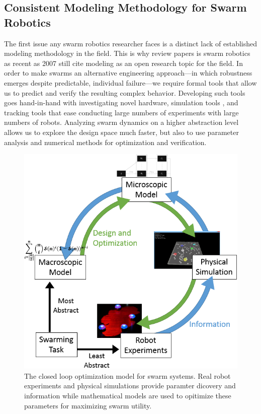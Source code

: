 \documentclass[11pt, onecolumn, compsoc, letterpaper]{article}
\begin{document}
\subsection{Consistent Modeling Methodology for Swarm Robotics}
The first issue any swarm robotics researcher faces is a distinct lack of established modeling methodology in the field.  This is why review papers is swarm robotics as recent as 2007 \cite{Bayindir2007} still cite modeling as an open research topic for the field. In order to make swarms an alternative engineering approach---in which robustness emerges despite predictable, individual failure---we require formal tools that allow us to predict and verify the resulting complex behavior. Developing such tools goes hand-in-hand with investigating novel hardware, simulation tools \cite{Michel1998}, and tracking tools \cite{correlliros06,lochmatter08} that ease conducting large numbers of experiments with large numbers of robots. Analyzing swarm dynamics on a higher abstraction level allows us to explore the design space much faster, but also to use parameter analysis and numerical methods for optimization and verification.

\begin{figure}[!htb]
	\centering\includegraphics[width=.75\textwidth]{../assets/ssmodel.png}
	\centering\caption{The closed loop optimization model for swarm systems. Real robot experiments and physical simulations provide paramter dicovery and information while mathematical models are used to opitimize these parameters for maximizing swarm utility.}\label{fig:ssmodel}
\end{figure}
\end{document}
